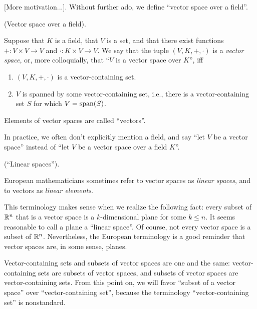 [More motivation...]. Without further ado, we define ``vector space over a field''.

\begin{defn}
\label{ch::lin_alg::defn::vector_space}
    (Vector space over a field).
    
    Suppose that $K$ is a field, that $V$ is a set, and that there exist functions $+:V \times V \rightarrow V$ and $\cdot:K \times V \rightarrow V$. We say that the tuple $(V, K, +, \cdot)$ is a \textit{vector space}, or, more colloquially, that ``$V$ is a vector space over $K$'', iff 

    \begin{enumerate}
        \item $(V, K, +, \cdot)$ is a vector-containing set.
        \item $V$ is spanned by some vector-containing set, i.e., there is a vector-containing set $S$ for which $V = \text{span}(S)$. 
    \end{enumerate}
    
    Elements of vector spaces are called ``vectors''.
    
    In practice, we often don't explicitly mention a field, and say ``let $V$ be a vector space'' instead of ``let $V$ be a vector space over a field $K$''.
\end{defn}

\begin{remark}
    (``Linear spaces'').

    European mathematicians sometimes refer to vector spaces as \textit{linear spaces}, and to vectors as \textit{linear elements}.

    This terminology makes sense when we realize the following fact: every subset of $\mathbb{R}^n$ that is a vector space is a $k$-dimensional plane for some $k \leq n$. It seems reasonable to call a plane a ``linear space''. Of course, not every vector space is a subset of $\mathbb{R}^n$. Nevertheless, the European terminology is a good reminder that vector spaces are, in some sense, planes.
\end{remark}

\begin{remark}
    Vector-containing sets and subsets of vector spaces are one and the same: vector-containing sets are subsets of vector spaces, and subsets of vector spaces are vector-containing sets. From this point on, we will favor ``subset of a vector space'' over ``vector-containing set'', because the terminology ``vector-containing set'' is nonstandard.
\end{remark}

